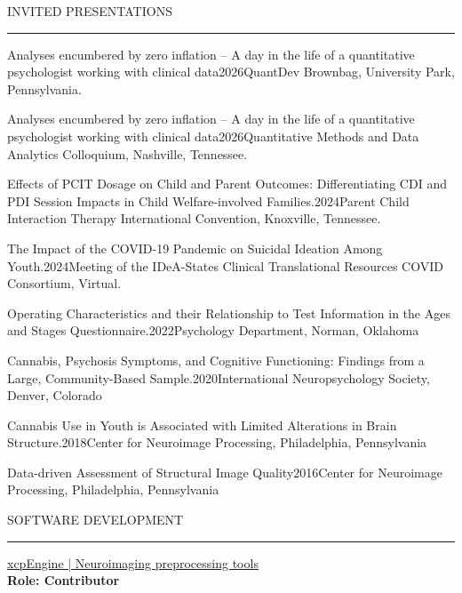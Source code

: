 \documentclass{resume} %
\renewenvironment{rSection}[1]{
	\sectionskip
	\textcolor{CarnegieMellonRed}{\MakeUppercase{#1}}
	\sectionlineskip
	\hrule
	\begin{list}{}{
			\setlength{\leftmargin}{1.5em}
		}
		\item[]
	}{
	\end{list}
}
\begin{document}
	\begin{rSection}{Invited Presentations}
		\begin{rSubsectionPres}{Analyses encumbered by zero inflation -- A day in the life of a quantitative psychologist working with clinical data}{2026}{QuantDev Brownbag, University Park, Pennsylvania.}
		\end{rSubsectionPres}
		\begin{rSubsectionPres}{Analyses encumbered by zero inflation -- A day in the life of a quantitative psychologist working with clinical data}{2026}{Quantitative Methods and Data Analytics Colloquium, Nashville, Tennessee.} 
		\end{rSubsectionPres}
		\begin{rSubsectionPres}{Effects of PCIT Dosage on Child and Parent Outcomes: Differentiating CDI and PDI Session Impacts in Child Welfare-involved Families.}{2024}{Parent Child Interaction Therapy International Convention, Knoxville, Tennessee.} 
		\end{rSubsectionPres}
		\begin{rSubsectionPres}{The Impact of the COVID-19 Pandemic on Suicidal Ideation Among Youth.}{2024}{Meeting of the IDeA-States Clinical Translational Resources COVID Consortium,  Virtual.} 
		\end{rSubsectionPres}
		\begin{rSubsectionPres}{Operating Characteristics and their Relationship to Test Information in the Ages and Stages Questionnaire.}{2022}{Psychology Department, Norman, Oklahoma} 
		\end{rSubsectionPres}
		\begin{rSubsectionPres}{Cannabis, Psychosis Symptoms, and Cognitive Functioning: Findings from a Large, Community-Based Sample.}{2020}{International Neuropsychology Society, Denver, Colorado} 
		\end{rSubsectionPres}
		\begin{rSubsectionPres}{Cannabis Use in Youth is Associated with Limited Alterations in Brain Structure.}{2018}{Center for Neuroimage Processing, Philadelphia, Pennsylvania} 
		\end{rSubsectionPres}
		\begin{rSubsectionPres}{Data-driven Assessment of Structural Image Quality}{2016}{Center for Neuroimage Processing, Philadelphia, Pennsylvania} 
		\end{rSubsectionPres}
	\end{rSection}
	
	\begin{rSection}{Software Development} \itemsep -2pt
		{\href{https://github.com/PennLINC/xcpEngine}{xcpEngine | Neuroimaging preprocessing tools}}\\
		{\bf{ \small{Role:}} Contributor}
	\end{rSection}
	
\end{document}
